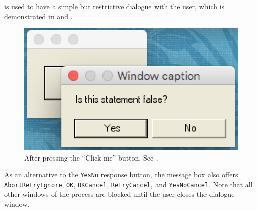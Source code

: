 \documentclass[fsharpnotes.tex]{subfiles}
\begin{document}
 is used to have a simple but restrictive dialogue with the user, which is demonstrated in  and .
%
%
\begin{figure}
  \centering
  \includegraphics[scale=0.5]{MessageBox}
  \caption{After pressing the ``Click-me'' button. See .}
  \label{fig:MessageBox}
\end{figure}
%
As an alternative to the \lstinline{YesNo} response button, the message box also offers \lstinline{AbortRetryIgnore}, \lstinline{OK}, \lstinline{OKCancel}, \lstinline{RetryCancel}, and \lstinline{YesNoCancel}. Note that all other windows of the process are blocked until the user closes the dialogue window.
\end{document}

